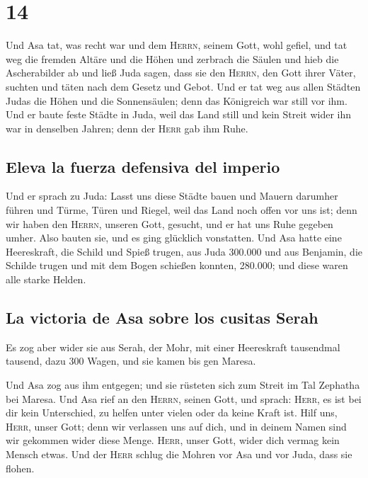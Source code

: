 \hypertarget{section-13}{%
\section{14}\label{section-13}}

 Und Asa tat, was recht war und dem \textsc{Herrn}, seinem
Gott, wohl gefiel,  und tat weg die fremden Altäre und die
Höhen und zerbrach die Säulen und hieb die Ascherabilder ab
 und ließ Juda sagen, dass sie den \textsc{Herrn}, den
Gott ihrer Väter, suchten und täten nach dem Gesetz und Gebot.
 Und er tat weg aus allen Städten Judas die Höhen und die
Sonnensäulen; denn das Königreich war still vor ihm.  Und
er baute feste Städte in Juda, weil das Land still und kein Streit wider
ihn war in denselben Jahren; denn der \textsc{Herr} gab ihm Ruhe.

\hypertarget{eleva-la-fuerza-defensiva-del-imperio}{%
\subsection{Eleva la fuerza defensiva del
imperio}\label{eleva-la-fuerza-defensiva-del-imperio}}

 Und er sprach zu Juda: Lasst uns diese Städte bauen und
Mauern darumher führen und Türme, Türen und Riegel, weil das Land noch
offen vor uns ist; denn wir haben den \textsc{Herrn}, unseren Gott,
gesucht, und er hat uns Ruhe gegeben umher. Also bauten sie, und es ging
glücklich vonstatten.  Und Asa hatte eine Heereskraft, die
Schild und Spieß trugen, aus Juda 300.000 und aus Benjamin, die Schilde
trugen und mit dem Bogen schießen konnten, 280.000; und diese waren alle
starke Helden.

\hypertarget{la-victoria-de-asa-sobre-los-cusitas-serah}{%
\subsection{La victoria de Asa sobre los cusitas
Serah}\label{la-victoria-de-asa-sobre-los-cusitas-serah}}

 Es zog aber wider sie aus Serah, der Mohr, mit einer
Heereskraft tausendmal tausend, dazu 300 Wagen, und sie kamen bis gen
Maresa.

 Und Asa zog aus ihm entgegen; und sie rüsteten sich zum
Streit im Tal Zephatha bei Maresa.  Und Asa rief an den
\textsc{Herrn}, seinen Gott, und sprach: \textsc{Herr}, es ist bei dir
kein Unterschied, zu helfen unter vielen oder da keine Kraft ist. Hilf
uns, \textsc{Herr}, unser Gott; denn wir verlassen uns auf dich, und in
deinem Namen sind wir gekommen wider diese Menge. \textsc{Herr}, unser
Gott, wider dich vermag kein Mensch etwas.  Und der
\textsc{Herr} schlug die Mohren vor Asa und vor Juda, dass sie flohen.

